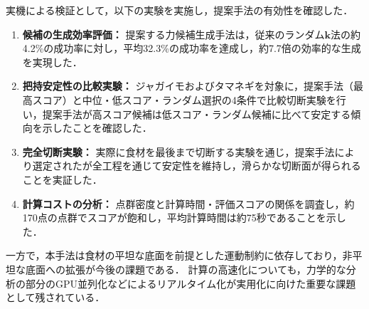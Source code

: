 実機による検証として，以下の実験を実施し，提案手法の有効性を確認した．
\begin{enumerate}
	\item \textbf{{\namegraspforce}候補の生成効率評価：} 提案する力候補生成手法は，従来のランダム$\bm{k}$法の約4.2\%の成功率に対し，平均32.3\%の成功率を達成し，約7.7倍の効率的な生成を実現した．
	\item \textbf{把持安定性の比較実験：} ジャガイモおよびタマネギを対象に，提案手法（最高スコア）と中位・低スコア・ランダム選択の4条件で比較切断実験を行い，提案手法が高スコア候補は低スコア・ランダム候補に比べて安定する傾向を示したことを確認した．
	\item \textbf{完全切断実験：} 実際に食材を最後まで切断する実験を通じ，提案手法により選定された{\nameholdingpointset}が全工程を通じて安定性を維持し，滑らかな切断面が得られることを実証した．
	\item \textbf{計算コストの分析：} 点群密度と計算時間・評価スコアの関係を調査し，約170点の点群でスコアが飽和し，平均計算時間は約75秒であることを示した．
\end{enumerate}

一方で，本手法は食材の平坦な底面を前提とした運動制約に依存しており，非平坦な底面への拡張が今後の課題である．
計算の高速化についても，力学的な分析の部分のGPU並列化などによるリアルタイム化が実用化に向けた重要な課題として残されている．
